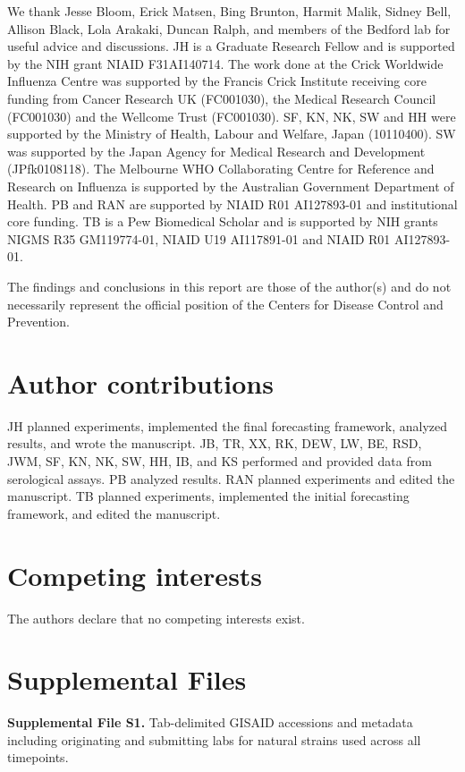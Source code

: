 We thank Jesse Bloom, Erick Matsen, Bing Brunton, Harmit Malik, Sidney Bell, Allison Black, Lola Arakaki, Duncan Ralph, and members of the Bedford lab for useful advice and discussions.
JH is a Graduate Research Fellow and is supported by the NIH grant NIAID F31AI140714.
The work done at the Crick Worldwide Influenza Centre was supported by the Francis Crick Institute receiving core funding from Cancer Research UK (FC001030), the Medical Research Council (FC001030) and the Wellcome Trust (FC001030).
SF, KN, NK, SW and HH were supported by the Ministry of Health, Labour and Welfare, Japan (10110400).
SW was supported by the Japan Agency for Medical Research and Development (JPfk0108118).
The Melbourne WHO Collaborating Centre for Reference and Research on Influenza is supported by the Australian Government Department of Health.
PB and RAN are supported by NIAID R01 AI127893-01 and institutional core funding.
TB is a Pew Biomedical Scholar and is supported by NIH grants NIGMS R35 GM119774-01, NIAID U19 AI117891-01 and NIAID R01 AI127893-01.

The findings and conclusions in this report are those of the author(s) and do not necessarily represent the official position of the Centers for Disease Control and Prevention.

\section*{Author contributions}

JH planned experiments, implemented the final forecasting framework, analyzed results, and wrote the manuscript.
JB, TR, XX, RK, DEW, LW, BE, RSD, JWM, SF, KN, NK, SW, HH, IB, and KS performed and provided data from serological assays.
PB analyzed results.
RAN planned experiments and edited the manuscript.
TB planned experiments, implemented the initial forecasting framework, and edited the manuscript.

\section*{Competing interests}

The authors declare that no competing interests exist.

\section*{Supplemental Files}

\textbf{Supplemental File S1.} Tab-delimited GISAID accessions and metadata including originating and submitting labs for natural strains used across all timepoints.

